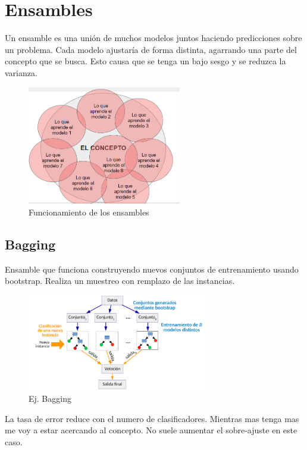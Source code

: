 \documentclass[titlepage,a4paper]{article}
\begin{document}
\section{Ensambles}

Un ensamble es una unión de muchos modelos juntos haciendo predicciones sobre un problema. Cada modelo ajustaría de forma distinta, agarrando una parte del concepto que se busca. Esto causa que se tenga un bajo sesgo y se reduzca la varianza.

\begin{figure}[!htb]
    \centering
    \includegraphics[width=0.6\textwidth]{imagenesResumen/ConceptoEnsamble.PNG}
    \caption{Funcionamiento de los ensambles}
\end{figure}

\subsection{Bagging}

Ensamble que funciona construyendo nuevos conjuntos de entrenamiento usando bootstrap. Realiza un muestreo con remplazo de las instancias.

\begin{figure}[!htb]
    \centering
    \includegraphics[width=0.7\textwidth]{imagenesResumen/Bagging.PNG}
    \caption{Ej. Bagging}
\end{figure}

La tasa de error reduce con el numero de clasificadores. Mientras mas tenga mas me voy a estar acercando al concepto. No suele aumentar el sobre-ajuste en este caso.
\end{document}
